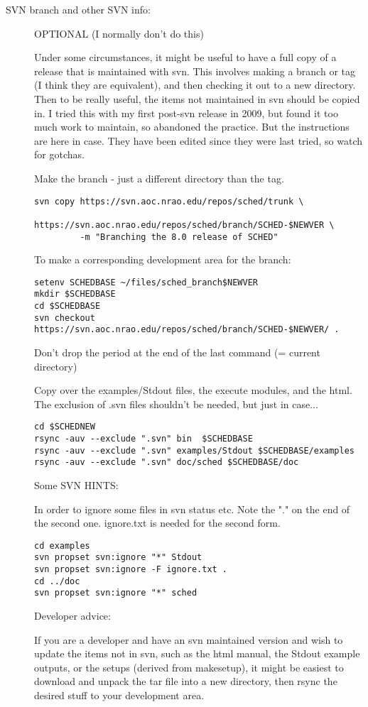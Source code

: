 \documentclass{report}
\begin{document}
\begin{description}
\item [SVN branch and other SVN info:]

OPTIONAL (I normally don't do this)

Under some circumstances, it might be useful to have a full copy of a
release that is maintained with svn.  This involves making a branch
or tag (I think they are equivalent), and then checking it out to 
a new directory.  Then to be really useful, the items not maintained
in svn should be copied in.  I tried this with my first post-svn 
release in 2009, but found it too much work to maintain, so abandoned the
practice.  But the instructions are here in case.  They have been
edited since they were last tried, so watch for gotchas.

Make the branch - just a different directory than the tag.

\begin{verbatim}
svn copy https://svn.aoc.nrao.edu/repos/sched/trunk \
         https://svn.aoc.nrao.edu/repos/sched/branch/SCHED-$NEWVER \
         -m "Branching the 8.0 release of SCHED"
\end{verbatim}

To make a corresponding development area for the branch:

\begin{verbatim}
setenv SCHEDBASE ~/files/sched_branch$NEWVER
mkdir $SCHEDBASE
cd $SCHEDBASE
svn checkout https://svn.aoc.nrao.edu/repos/sched/branch/SCHED-$NEWVER/ .
\end{verbatim}

Don't drop the period at the end of the last command (= current directory)

Copy over the examples/Stdout files, the execute modules, and the html.
The exclusion of .svn files shouldn't be needed, but just in case...

\begin{verbatim}
cd $SCHEDNEW
rsync -auv --exclude ".svn" bin  $SCHEDBASE
rsync -auv --exclude ".svn" examples/Stdout $SCHEDBASE/examples
rsync -auv --exclude ".svn" doc/sched $SCHEDBASE/doc
\end{verbatim}


Some SVN HINTS:

In order to ignore some files in svn status etc.
Note the "." on the end of the second one.  
ignore.txt is needed for the second form.

\begin{verbatim}
cd examples
svn propset svn:ignore "*" Stdout
svn propset svn:ignore -F ignore.txt .
cd ../doc
svn propset svn:ignore "*" sched
\end{verbatim}

Developer advice:

If you are a developer and have an svn maintained version and wish to
update the items not in svn, such as the html manual, the Stdout
example outputs, or the setups (derived from makesetup), it might be
easiest to download and unpack the tar file into a new directory,
then rsync the desired stuff to your development area.

\end{description}
\end{document}
